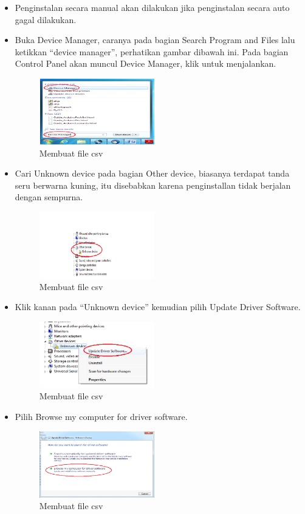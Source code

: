 \begin{enumerate}
\begin{itemize}
\item Penginstalan secara manual akan dilakukan jika penginstalan secara auto gagal dilakukan.
\item Buka Device Manager, caranya pada bagian Search Program and Files lalu ketikkan “device manager”, perhatikan gambar dibawah ini. Pada bagian Control Panel akan muncul Device Manager, klik untuk menjalankan.
\begin{figure}[H] 
\includegraphics[width=5cm]{figures/5/Teori/1174038/4.png}
\centering
\caption{Membuat file csv}
\end{figure}

\item Cari Unknown device pada bagian Other device, biasanya terdapat tanda seru berwarna kuning, itu disebabkan karena penginstallan tidak berjalan dengan sempurna.
\begin{figure}[H] 
\includegraphics[width=5cm]{figures/5/Teori/1174038/5.png}
\centering
\caption{Membuat file csv}
\end{figure}

\item Klik kanan pada “Unknown device” kemudian pilih Update Driver Software.
\begin{figure}[H] 
\includegraphics[width=5cm]{figures/5/Teori/1174038/6.png}
\centering
\caption{Membuat file csv}
\end{figure}

\item Pilih Browse my computer for driver software.
\begin{figure}[H] 
\includegraphics[width=5cm]{figures/5/Teori/1174038/7.png}
\centering
\caption{Membuat file csv}
\end{figure}


\end{itemize}
\end{enumerate}
